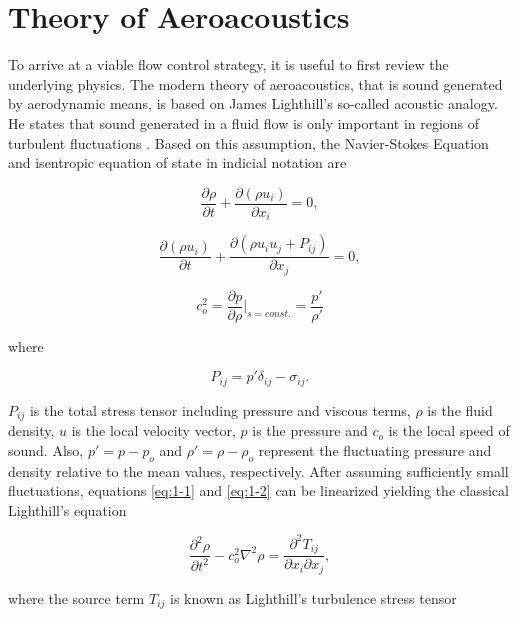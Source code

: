 \section{Theory of Aeroacoustics}
To arrive at a viable flow control strategy, it is useful to first review the underlying physics.
The modern theory of aeroacoustics, that is sound generated by aerodynamic means, is based on James Lighthill's so-called acoustic analogy. He states that sound generated in a fluid flow is only important in regions of turbulent fluctuations \cite{howe2003}. Based on this assumption, the Navier-Stokes Equation and isentropic equation of state in indicial notation are

\begin{equation} \label{eq:1-1}
	\frac{\partial \rho}{\partial t} + \frac{\partial(\rho u_i)}{\partial x_i} = 0,
\end{equation}

\begin{equation} \label{eq:1-2}
\frac{\partial (\rho u_i)}{\partial t} + \frac{\partial(\rho u_i u_j + P_{ij})}{\partial x_j} = 0,
\end{equation}

\begin{equation} \label{eq:1-3}
	c_o^2 = \frac{\partial p}{\partial \rho}|_{s=const.} = \frac{p'}{\rho'}
\end{equation}

where 

\begin{equation} \label{eq:pij}
P_{ij} = p' \delta_{ij} - \sigma_{ij}.
\end{equation}

$P_{ij}$ is the total stress tensor including pressure and viscous terms, $\rho$ is the fluid density, $u$ is  the local velocity vector, $p$ is the pressure and $c_o$ is the local speed of sound. Also, $p' = p - p_o$ and $\rho' = \rho - \rho_o$ represent the fluctuating pressure and density relative to the mean values, respectively. After assuming sufficiently small fluctuations, equations \ref{eq:1-1} and \ref{eq:1-2} can be linearized yielding the classical Lighthill's equation

\begin{equation} \label{eq:1-4}
\frac{\partial^2 \rho}{\partial t^2} - c_o^2 \nabla^2 \rho = \frac{\partial^2 T_{ij}}{\partial x_i \partial x_j},
\end{equation}

where the source term $T_{ij}$ is known as Lighthill's turbulence stress tensor


